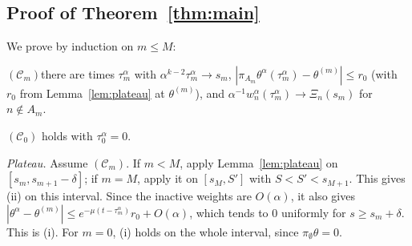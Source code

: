 \documentclass[11pt]{article}
\theoremstyle{definition}
\theoremstyle{remark}
\begin{document}
\subsection*{Proof of Theorem~\ref{thm:main}}

We prove by induction on $m\le M$:

\smallskip\noindent$(\mathcal C_m)$\quad there are times $\tau^\alpha_m$ with $\alpha^{k-2}\tau^\alpha_m\to s_m$, $|\pi_{A_m}\theta^\alpha(\tau^\alpha_m)-\theta^{(m)}|\le r_0$ (with $r_0$ from Lemma~\ref{lem:plateau} at $\theta^{(m)}$), and $\alpha^{-1}w^\alpha_n(\tau^\alpha_m)\to\Xi_n(s_m)$ for $n\notin A_m$.

\smallskip\noindent$(\mathcal C_0)$ holds with $\tau^\alpha_0=0$.

\emph{Plateau.} Assume $(\mathcal C_m)$. If $m<M$, apply Lemma~\ref{lem:plateau} on $[s_m,s_{m+1}-\delta]$; if $m=M$, apply it on $[s_M,S']$ with $S<S'<s_{M+1}$. This gives (ii) on this interval. Since the inactive weights are $O(\alpha)$, it also gives $|\theta^\alpha-\theta^{(m)}|\le e^{-\mu(t-\tau^\alpha_m)}r_0+O(\alpha)$, which tends to $0$ uniformly for $s\ge s_m+\delta$. This is (i). For $m=0$, (i) holds on the whole interval, since $\pi_\emptyset\theta=0$.
\end{document}

